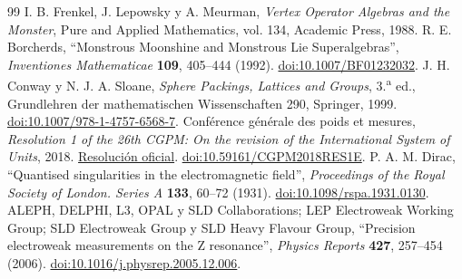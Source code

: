 \begin{thebibliography}{99}
 I. B. Frenkel, J. Lepowsky y A. Meurman, \emph{Vertex Operator Algebras and the Monster}, Pure and Applied Mathematics, vol. 134, Academic Press, 1988.
 R. E. Borcherds, ``Monstrous Moonshine and Monstrous Lie Superalgebras'', \emph{Inventiones Mathematicae} \textbf{109}, 405--444 (1992). \href{https://doi.org/10.1007/BF01232032}{doi:10.1007/BF01232032}.
 J. H. Conway y N. J. A. Sloane, \emph{Sphere Packings, Lattices and Groups}, 3.\textsuperscript{a} ed., Grundlehren der mathematischen Wissenschaften 290, Springer, 1999. \href{https://doi.org/10.1007/978-1-4757-6568-7}{doi:10.1007/978-1-4757-6568-7}.
 Conférence générale des poids et mesures, \emph{Resolution 1 of the 26th CGPM: On the revision of the International System of Units}, 2018. \href{https://www.bipm.org/en/committees/cg/cgpm/26-2018/resolution-1}{Resolución oficial}. \href{https://doi.org/10.59161/CGPM2018RES1E}{doi:10.59161/CGPM2018RES1E}.
 P. A. M. Dirac, ``Quantised singularities in the electromagnetic field'', \emph{Proceedings of the Royal Society of London. Series A} \textbf{133}, 60--72 (1931). \href{https://doi.org/10.1098/rspa.1931.0130}{doi:10.1098/rspa.1931.0130}.
 ALEPH, DELPHI, L3, OPAL y SLD Collaborations; LEP Electroweak Working Group; SLD Electroweak Group y SLD Heavy Flavour Group, ``Precision electroweak measurements on the Z resonance'', \emph{Physics Reports} \textbf{427}, 257--454 (2006). \href{https://doi.org/10.1016/j.physrep.2005.12.006}{doi:10.1016/j.physrep.2005.12.006}.
\end{thebibliography}
